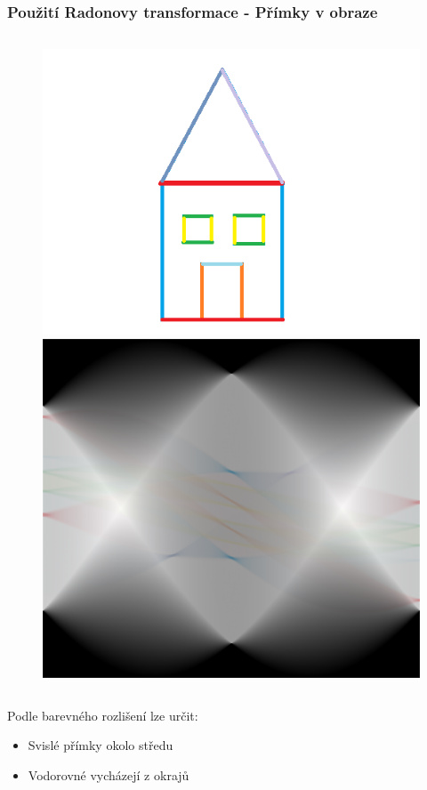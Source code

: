 \documentclass{beamer}
\begin{document}
\begin{frame}
\frametitle{Použití Radonovy transformace - Přímky v obraze}
\begin{figure}
\begin{columns}
	  \includegraphics[width=\linewidth]{house.png}
	  \includegraphics[width=\linewidth]{sinohouse.png}
	 \label{fig:sub4}
\end{columns}
\end{figure}
Podle barevného rozlišení lze určit:
\begin{itemize}
\item Svislé přímky okolo středu
\item Vodorovné vycházejí z okrajů
\end{itemize}
\end{frame}
\end{document}
